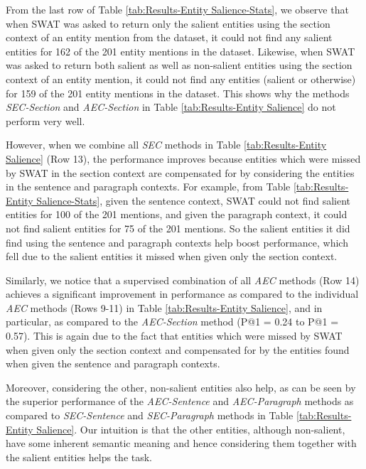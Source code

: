 \documentclass[sigconf,authordraft]{acmart}
\begin{document}
From the last row of Table \ref{tab:Results-Entity Salience-Stats}, we observe that when SWAT was asked to return only the salient entities using the section context of an entity mention from the dataset, it could not find any salient entities for 162 of the 201 entity mentions in the dataset. Likewise, when SWAT was asked to return both salient as well as non-salient entities using the section context of an entity mention, it could not find any entities (salient or otherwise) for  159 of the 201 entity mentions in the dataset. This shows why the methods \textit{SEC-Section} and \textit{AEC-Section} in Table \ref{tab:Results-Entity Salience} do not perform very well. 

However, when we combine all \textit{SEC} methods in Table \ref{tab:Results-Entity Salience} (Row 13), the performance improves because entities which were missed by SWAT in the section context are compensated for by considering the entities in the sentence and paragraph contexts. For example, from Table \ref{tab:Results-Entity Salience-Stats}, given the sentence context, SWAT could not find salient entities for 100 of the 201 mentions, and given the paragraph context, it could not find salient entities for 75 of the 201 mentions. So the salient entities it did find using the sentence and paragraph contexts help boost performance, which fell due to the salient entities it missed when given only the section context. 

Similarly, we notice that a supervised combination of all \textit{AEC} methods (Row 14) achieves a significant improvement in performance as compared to the individual \textit{AEC} methods (Rows 9-11) in Table \ref{tab:Results-Entity Salience}, and in particular, as compared to the \textit{AEC-Section} method (P@1 = 0.24 to P@1 = 0.57). This is again due to the fact that entities which were missed by SWAT when given only the section context and compensated for by the entities found when given the sentence and paragraph contexts. 

Moreover, considering the other, non-salient entities also help, as can be seen by the superior performance of the \textit{AEC-Sentence} and \textit{AEC-Paragraph} methods as compared to \textit{SEC-Sentence} and \textit{SEC-Paragraph} methods in Table \ref{tab:Results-Entity Salience}. Our intuition is that the other entities, although non-salient, have some inherent semantic meaning and hence considering them together with the salient entities helps the task.

\end{document}
